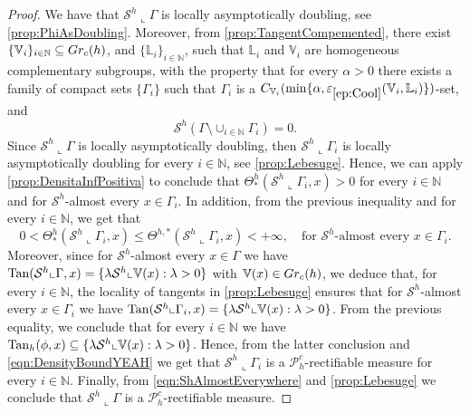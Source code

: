 \documentclass[10pt, a4paper,
oneside, headinclude,footinclude]{scrartcl}
\begin{document}
\begin{proof}
We have that $\mathcal{S}^h\llcorner\Gamma$ is locally asymptotically doubling, see \cref{prop:PhiAsDoubling}. Moreover, from \cref{prop:TangentCompemented}, there exist $\{\mathbb V_i\}_{i\in\mathbb N}\subseteq Gr_c(h)$, and $\{\mathbb L_i\}_{i\in\mathbb N}$, such that $\mathbb L_i$ and $\mathbb V_i$ are homogeneous complementary subgroups, with the property that for every $\alpha>0$ there exists a family of compact sets $\{\Gamma_i\}$ such that $\Gamma_i$ is a $C_{\mathbb V_i}(\min\{\alpha,\oldep{ep:Cool}(\mathbb V_i,\mathbb L_i)\})$-set, and
\begin{equation}\label{eqn:ShAlmostEverywhere}
\mathcal{S}^h(\Gamma \setminus \cup_{i\in\mathbb N}\Gamma_i)=0.
\end{equation}
Since $\mathcal{S}^h\llcorner\Gamma$ is locally asymptotically doubling, then $\mathcal{S}^h\llcorner\Gamma_i$ is locally asymptotically doubling for every $i\in\mathbb N$, see \cref{prop:Lebesuge}. Hence, we can apply \cref{prop:DensitaInfPositiva} to conclude that  $\Theta^h_*(\mathcal{S}^h\llcorner\Gamma_i,x)>0$  for every $i\in\mathbb N$ and for $\mathcal{S}^h$-almost every $x\in\Gamma_i$. In addition, from the previous inequality and \cite[2.10.19(5)]{Federer1996GeometricTheory} for every $i\in\mathbb N$, we get that
\begin{equation}\label{eqn:DensityBoundYEAH}
0<\Theta^h_*(\mathcal{S}^h\llcorner\Gamma_i,x)\leq \Theta^{h,*}(\mathcal{S}^h\llcorner\Gamma_i,x)<+\infty, \quad \text{for $\mathcal{S}^h$-almost every $x\in\Gamma_i$.}
\end{equation}
Moreover, since for $\mathcal{S}^h$-almost every $x\in\Gamma$ we have $\mathrm{Tan}(\mathcal{S}^h\llcorner\Gamma,x)=\{\lambda\mathcal{S}^h\llcorner\mathbb V(x):\lambda>0\}$ with $\mathbb V(x)\in Gr_c(h)$, we deduce that, for every $i\in\mathbb N$, the locality of tangents in \cref{prop:Lebesuge} ensures that for $\mathcal{S}^h$-almost every $x\in\Gamma_i$ we have $\mathrm{Tan}(\mathcal{S}^h\llcorner\Gamma_i,x)=\{\lambda\mathcal{S}^h\llcorner\mathbb V(x):\lambda>0\}$. From the previous equality, we conclude that for every $i\in\mathbb N$ we have $\mathrm{Tan}_h(\phi,x)\subseteq\{\lambda\mathcal{S}^h\llcorner\mathbb V(x):\lambda>0\}$. Hence, from the latter conclusion and \eqref{eqn:DensityBoundYEAH} we get that $\mathcal{S}^h\llcorner\Gamma_i$ is a $\mathscr{P}_h^c$-rectifiable measure for every $i\in\mathbb N$. Finally, from \eqref{eqn:ShAlmostEverywhere} and \cref{prop:Lebesuge} we conclude that $\mathcal{S}^h\llcorner\Gamma$ is a $\mathscr{P}^c_h$-rectifiable measure. %
\end{proof}
\end{document}
